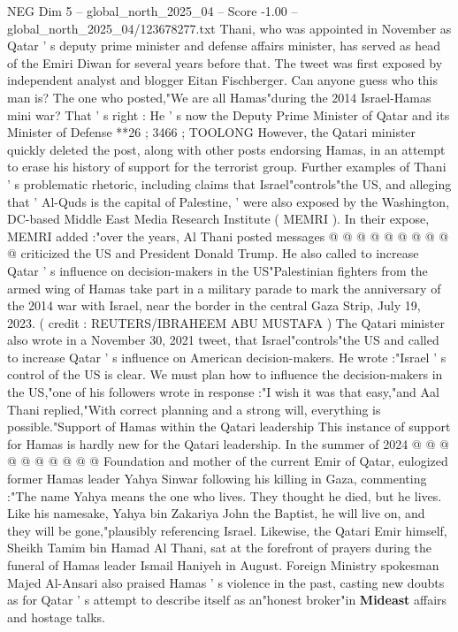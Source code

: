 \begin{textsample}{NEG Dim 5 – global\_north\_2025\_04 – Score -1.00 – global\_north\_2025\_04/123678277.txt}  \label{ex:f5_neg_361}
Thani, who was appointed in November as Qatar ' s deputy prime minister and defense affairs minister, has served as head of the Emiri Diwan for several years before that.
The tweet was first exposed by independent analyst and blogger Eitan Fischberger.
Can anyone guess who this man is?
The one who posted,"We are all Hamas"during the 2014 Israel-Hamas mini war?
That ' s right : He ' s now the Deputy Prime Minister of Qatar and its Minister of Defense **26 ; 3466 ; TOOLONG However, the Qatari minister quickly deleted the post, along with other posts endorsing Hamas, in an attempt to erase his history of support for the terrorist group.
Further examples of Thani ' s problematic rhetoric, including claims that Israel"controls"the US, and alleging that ' Al-Quds is the capital of Palestine, ' were also exposed by the Washington, DC-based Middle East Media Research Institute ( MEMRI ).
In their expose, MEMRI added :"over the years, Al Thani posted messages @ @ @ @ @ @ @ @ @ @ criticized the US and President Donald Trump.
He also called to increase Qatar ' s influence on decision-makers in the US"Palestinian fighters from the armed wing of Hamas take part in a military parade to mark the anniversary of the 2014 war with Israel, near the border in the central Gaza Strip, July 19, 2023. ( credit : REUTERS/IBRAHEEM ABU MUSTAFA ) The Qatari minister also wrote in a November 30, 2021 tweet, that Israel"controls"the US and called to increase Qatar ' s influence on American decision-makers.
He wrote :"Israel ' s control of the US is clear.
We must plan how to influence the decision-makers in the US,"one of his followers wrote in response :"I wish it was that easy,"and Aal Thani replied,"With correct planning and a strong will, everything is possible."Support of Hamas within the Qatari leadership This instance of support for Hamas is hardly new for the Qatari leadership.
In the summer of 2024 @ @ @ @ @ @ @ @ @ @ Foundation and mother of the current Emir of Qatar, eulogized former Hamas leader Yahya Sinwar following his killing in Gaza, commenting :"The name Yahya means the one who lives.
They thought he died, but he lives.
Like his namesake, Yahya bin Zakariya John the Baptist, he will live on, and they will be gone,"plausibly referencing Israel.
Likewise, the Qatari Emir himself, Sheikh Tamim bin Hamad Al Thani, sat at the forefront of prayers during the funeral of Hamas leader Ismail Haniyeh in August.
Foreign Ministry spokesman Majed Al-Ansari also praised Hamas ' s violence in the past, casting new doubts as for Qatar ' s attempt to describe itself as an"honest broker"in \textbf{Mideast} affairs and hostage talks.

\end{textsample}
